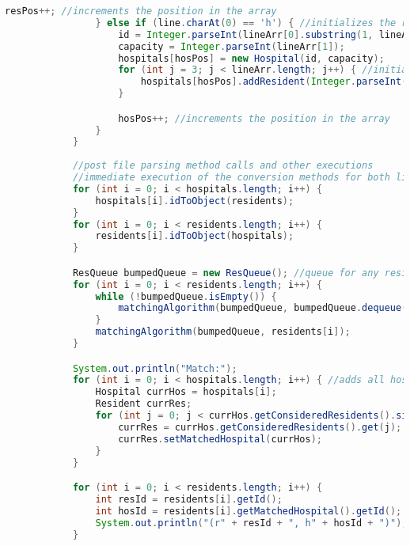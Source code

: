 \documentclass[letterpaper, 10pt,DIV=13]{scrartcl}
\numberwithin{equation}{section} %
\numberwithin{figure}{section} %
\numberwithin{table}{section} %
\begin{document}
\begin{lstlisting}[frame=single, language=java, breaklines]
                    resPos++; //increments the position in the array
                } else if (line.charAt(0) == 'h') { //initializes the rankings of each resident. First index is first choice, last is last choice.
                    id = Integer.parseInt(lineArr[0].substring(1, lineArr[0].length() - 1));
                    capacity = Integer.parseInt(lineArr[1]);
                    hospitals[hosPos] = new Hospital(id, capacity);
                    for (int j = 3; j < lineArr.length; j++) { //initializes the rankings of each hospital. First index is first choice, last is last choice.
                        hospitals[hosPos].addResident(Integer.parseInt(lineArr[j].substring(1)));
                    }

                    hosPos++; //increments the position in the array
                }   
            }
            
            //post file parsing method calls and other executions
            //immediate execution of the conversion methods for both lists
            for (int i = 0; i < hospitals.length; i++) {
                hospitals[i].idToObject(residents);
            }
            for (int i = 0; i < residents.length; i++) {
                residents[i].idToObject(hospitals);
            }

            ResQueue bumpedQueue = new ResQueue(); //queue for any residents that get bumped from a hospital
            for (int i = 0; i < residents.length; i++) {
                while (!bumpedQueue.isEmpty()) {
                    matchingAlgorithm(bumpedQueue, bumpedQueue.dequeue().getMyRes());
                }
                matchingAlgorithm(bumpedQueue, residents[i]);
            }

            System.out.println("Match:");
            for (int i = 0; i < hospitals.length; i++) { //adds all hospitals to their resident's matchedHospital member
                Hospital currHos = hospitals[i];
                Resident currRes;
                for (int j = 0; j < currHos.getConsideredResidents().size(); j++) {
                    currRes = currHos.getConsideredResidents().get(j);
                    currRes.setMatchedHospital(currHos);
                }
            }

            for (int i = 0; i < residents.length; i++) {
                int resId = residents[i].getId();
                int hosId = residents[i].getMatchedHospital().getId();
                System.out.println("(r" + resId + ", h" + hosId + ")");
            }


\end{lstlisting}
\end{document}
